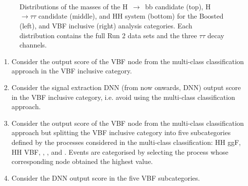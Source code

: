 \documentclass[../main.tex]{subfiles}
\begin{document}
\begin{figure}[p!]
\begin{center}
\\
\\
\\
\end{center}
\caption[Mass distributions in the boosted and VBF inclusive categories in 2018]{Distributions of the masses of the H~$\to$~bb candidate (top), H~$\to\tau\tau$ candidate (middle), and HH system (bottom) for the Boosted (left), and VBF inclusive (right) analysis categories. Each distribution contains the full Run 2 data sets and the three $\tau\tau$ decay channels.}
\label{hh:fig:dist_2}
\end{figure}

\begin{enumerate}
	\item Consider the output score of the VBF node from the multi-class classification approach in the VBF inclusive category.
	\item Consider the signal extraction DNN (from now onwards, DNN) output score in the VBF inclusive category, i.e. avoid using the multi-class classification approach.
	\item Consider the output score of the VBF node from the multi-class classification approach but splitting the VBF inclusive category into five subcategories defined by the processes considered in the multi-class classification: HH ggF, HH VBF, \ttbar{}, \tth, and \dyjets{}. Events are categorised by selecting the process whose corresponding node obtained the highest value.
	\item Consider the DNN output score in the five VBF subcategories.
\end{enumerate}
\end{document}
